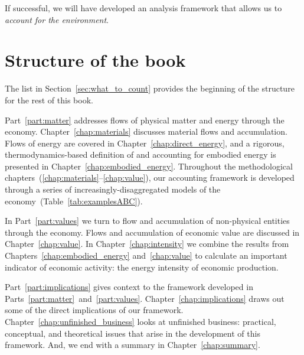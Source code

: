 \noindent{}If successful, we will have developed an analysis framework 
that allows us to \emph{account for the environment}.


\section{Structure of the book}
\label{sec:structure}

The list in Section~\ref{sec:what_to_count} 
provides the beginning of the structure for the rest of this book.

Part~\ref{part:matter} addresses flows of physical matter and energy
through the economy.
Chapter~\ref{chap:materials} discusses material flows and accumulation.
Flows of energy are covered in Chapter~\ref{chap:direct_energy}, 
and a rigorous, thermodynamics-based definition of and accounting for 
embodied energy is presented in Chapter~\ref{chap:embodied_energy}.
Throughout the methodological chapters~(\ref{chap:materials}--\ref{chap:value}),
our accounting framework is developed
through a series of increasingly-disaggregated
models of the economy~(Table~\ref{tab:examplesABC}).

In Part~\ref{part:values} we turn to flow and accumulation of 
non-physical entities through the economy. 
Flows and accumulation of economic value are discussed in Chapter~\ref{chap:value}.
In Chapter~\ref{chap:intensity} we combine the results from 
Chapters~\ref{chap:embodied_energy} and~\ref{chap:value} to
calculate an important indicator of economic activity:
the energy intensity of economic production.

Part~\ref{part:implications} gives context to the framework developed in
Parts~\ref{part:matter}~and~\ref{part:values}.
Chapter~\ref{chap:implications} draws out some of the direct implications
of our framework.
Chapter~\ref{chap:unfinished_business} looks at 
unfinished business: practical, conceptual, and theoretical issues
that arise in the development of this framework.
And, we end with a summary in Chapter~\ref{chap:summary}.



